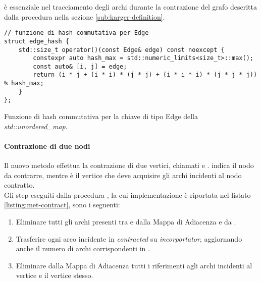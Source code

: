 \noindent {} è essenziale nel tracciamento degli archi durante la contrazione del grafo descritta dalla procedura   nella sezione \ref{sub:karger-definition}.\\

\begin{listing}[!ht]
\begin{verbatim}
// funzione di hash commutativa per Edge
struct edge_hash {
    std::size_t operator()(const Edge& edge) const noexcept {
        constexpr auto hash_max = std::numeric_limits<size_t>::max();
        const auto& [i, j] = edge;
        return (i * j + (i * i) * (j * j) + (i * i * i) * (j * j * j)) % hash_max;
    }
};
\end{verbatim}
\caption{Funzione di hash commutativa per la chiave di tipo Edge della \textit{std::unordered\_map}.}
\label{listing:hash-fun}
\end{listing}

\paragraph{Contrazione di due nodi}

Il nuovo metodo  effettua la contrazione di due vertici, chiamati  e .  indica il nodo da contrarre, mentre  è il vertice che deve acquisire gli archi incidenti al nodo contratto. \\

\noindent Gli step eseguiti dalla procedura , la cui implementazione è riportata nel listato \ref{listing:met-contract}, sono i seguenti:

\begin{enumerate}
    \item Eliminare tutti gli archi presenti tra
       e  dalla Mappa di Adiacenza e da .

    \item Trasferire ogni arco incidente in
      \textit{contracted} su \textit{incorportator}, aggiornando anche il numero di archi corrispondenti in .

    \item Eliminare dalla Mappa di Adiacenza tutti i riferimenti agli archi incidenti al vertice  e il vertice stesso.
\end{enumerate}

